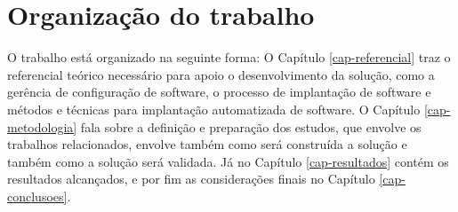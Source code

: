 \section{Organização do trabalho}
\label{sec:organizacao}

O trabalho está organizado na seguinte forma: O Capítulo \ref{cap-referencial}
traz o referencial teórico necessário para apoio o desenvolvimento da solução,
como a gerência de configuração de software, o processo de implantação de software
 e métodos e técnicas para implantação automatizada de software. O Capítulo
\ref{cap-metodologia}
fala sobre a definição e preparação dos estudos, que envolve os trabalhos relacionados,
envolve também como será construída a solução e também como a solução será validada.
Já no Capítulo \ref{cap-resultados} contém os resultados alcançados, e por fim as
considerações finais no Capítulo \ref{cap-conclusoes}.

